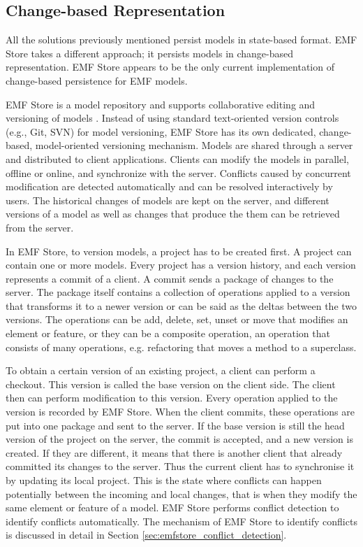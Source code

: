 \subsection{Change-based Representation}
\label{sec:change_based_representation}
All the solutions previously mentioned persist models in state-based format. EMF Store \cite{koegel2010emfstore} takes a different approach; it persists models in change-based representation. EMF Store appears to be the only current implementation of change-based persistence for EMF models.

EMF Store is a model repository and supports collaborative editing and versioning of models \cite{emfstore2019what}. Instead of using standard text-oriented version controls (e.g., Git, SVN) for model versioning, EMF Store has its own dedicated, change-based, model-oriented versioning mechanism. Models are shared through a server and distributed to client applications. Clients can modify the models in parallel, offline or online, and synchronize with the server. Conflicts caused by concurrent modification are detected automatically and can be resolved interactively by users. The historical changes of models are kept on the server, and different versions of a model as well as changes that produce the them can be retrieved from the server. 

In EMF Store, to version models, a project has to be created first. A project can contain one or more models. Every project has a version history, and each version represents a commit of a client. A commit sends a package of changes to the server. The package itself contains a collection of operations applied to a version that transforms it to a newer version or can be said as the deltas between the two versions. The operations can be add, delete, set, unset or move that modifies an element or feature, or they can be a composite operation, an operation that consists of many operations, e.g. refactoring that moves a method to a superclass.

To obtain a certain version of an existing project, a client can perform a checkout. This version is called the base version on the client side. The client then can perform modification to this version. Every operation applied to the version is recorded by EMF Store. When the client commits, these operations are put into one package and sent to the server. If the base version is still the head version of the project on the server, the commit is accepted, and a new version is created. If they are different, it means that there is another client that already committed its changes to the server. Thus the current client has to synchronise it by updating its local project. This is the state where conflicts can happen potentially between the incoming and local changes, that is when they modify the same element or feature of a model. EMF Store performs conflict detection to identify conflicts automatically. The mechanism of EMF Store to identify conflicts is discussed in detail in Section \ref{sec:emfstore_conflict_detection}.

